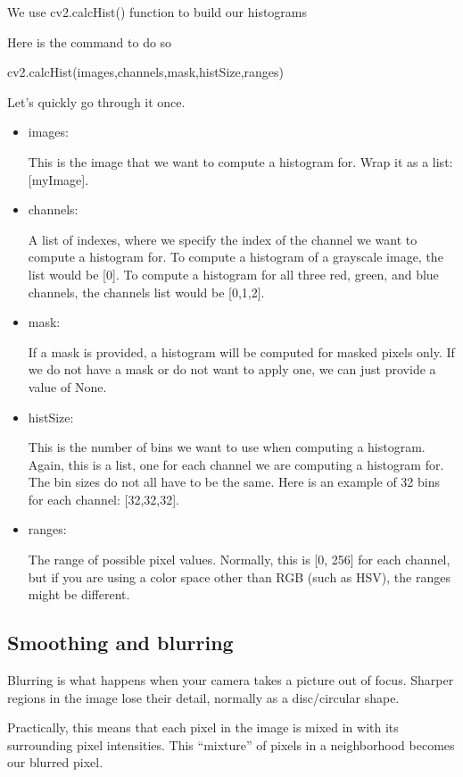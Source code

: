 \documentclass[BTech]{srmuthesis}
\begin{document}
We use cv2.calcHist() function to build our histograms

Here is the command to do so 

cv2.calcHist(images,channels,mask,histSize,ranges)

Let's quickly go through it once.

\begin{itemize}
    \item images: \par  This is the image that we want to compute a histogram for. Wrap it as a list: [myImage].
    \item channels: \par  A list of indexes, where we specify the index of the channel we want to compute a histogram for. To compute a histogram of a grayscale image, the list would be [0]. To compute a histogram for all three red, green, and blue channels, the channels list would be [0,1,2].
    \item mask: \par If a mask is provided, a histogram will be computed for masked pixels only. If we do not have a mask or do not want to apply one, we can just provide a value of None.
    \item histSize: \par This is the number of bins we want to use when computing a histogram. Again, this is a list, one for each channel we are computing a histogram for. The bin sizes do not all have to be the same. Here is an example of 32 bins for each channel: [32,32,32].
    \item ranges: \par The range of possible pixel values. Normally, this is [0, 256] for each channel, but if you are using a color space other than RGB (such as HSV), the ranges might be different.
\end{itemize}  

\subsection{Smoothing and blurring}

Blurring is what happens when your camera takes a picture out of focus. Sharper regions in the image lose their detail, normally as a disc/circular shape.

Practically, this means that each pixel in the image is mixed in with its surrounding pixel intensities. This “mixture” of pixels in a neighborhood becomes our blurred pixel.
\end{document}
